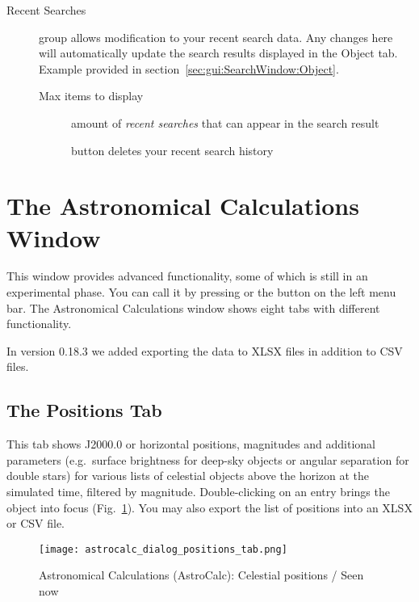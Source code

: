 \begin{description}
\item[Recent Searches]group allows modification to your recent search data. 
Any changes here will automatically update the search results displayed in the Object tab. 
Example provided in section~\ref{sec:gui:SearchWindow:Object}.
\begin{description}
\item[Max items to display] amount of \emph{recent searches} that can appear in the search result
\item[] button deletes your recent search history
\end{description}
\end{description}

\section{The Astronomical Calculations Window}
\label{sec:gui:AstroCalc}

This window  provides advanced functionality, some of which is still in an experimental phase.
You can call it by pressing  or the button  on the left menu bar. 
The Astronomical Calculations window shows eight tabs with different functionality.

In version 0.18.3  we added exporting the data to XLSX files in addition to CSV files.

\subsection{The Positions Tab}
\label{sec:gui:AstroCalc:Positions}

This tab  shows J2000.0 or horizontal positions, magnitudes and additional parameters 
(e.g.\ surface brightness for deep-sky objects or angular separation for double stars) for various 
lists of celestial objects above the horizon at the simulated time, filtered by magnitude. 
Double-clicking on an entry brings the object into focus (Fig.~\ref{fig:gui:AstroCalc:Positions}). 
You may also export the list of positions into an XLSX or CSV file.

\begin{figure}[htbp]
	\centering\texttt{[image: astrocalc\_dialog\_positions\_tab.png]}
	\caption{Astronomical Calculations (AstroCalc): Celestial positions / Seen now}
	\label{fig:gui:AstroCalc:Positions}
\end{figure}

